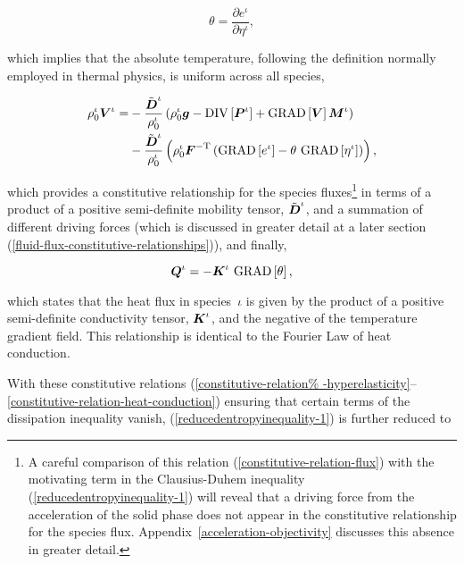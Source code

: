 \begin{equation}
\theta = \frac{\partial e^\iota}{\partial \eta^\iota},
\label{constitutive-relation-temperature}
\end{equation}

\noindent which implies that the absolute temperature, following the
definition normally employed in thermal physics, is uniform across all
species,

\begin{equation}
\begin{split}
\rho^\iota_0\mbox{\boldmath$ V$}^\iota  = & -\frac{\tilde{\mbox{\boldmath$ D$}}^\iota}{\rho^\iota_0} \left(
 \rho_0^\iota\mbox{\boldmath$ g$} - \mathrm{DIV}\left[\mbox{\boldmath$ P$}^\iota\right] +
\mathrm{GRAD}\left[\mbox{\boldmath$ V$}\right]\mbox{\boldmath$ M$}^\iota\right)\\
& -\frac{\tilde{\mbox{\boldmath$ D$}}^\iota}{\rho^\iota_0}\left(\rho^\iota_0
\mbox{\boldmath$ F$}^{-\mathrm{T}}\left( \mathrm{GRAD}\left[ e^\iota\right]
  - \theta\ \mathrm{GRAD}\left[\eta^\iota\right]\right)\right),
\label{constitutive-relation-flux}
\end{split}
\end{equation}

\noindent which provides a constitutive relationship for the species
fluxes\footnote{A careful comparison of this relation
  (\ref{constitutive-relation-flux}) with the motivating term in the
  Clausius-Duhem inequality (\ref{reducedentropyinequality-1}) will
  reveal that a driving force from the acceleration of the solid phase
  does not appear in the constitutive relationship for the species
  flux. Appendix~\ref{acceleration-objectivity} discusses this absence
  in greater detail.} in terms of a product of a positive
semi-definite mobility tensor, ${\tilde{\mbox{\boldmath$ D$}}}^\iota$, and a summation
of different driving forces (which is discussed in greater detail at a
later section (\ref{fluid-flux-constitutive-relationships})), and
finally,

\begin{equation}
\bQ^\iota = -{\bK}^\iota\ \mathrm{GRAD}\left[\theta\right],
\label{constitutive-relation-heat-conduction}
\end{equation}

\noindent which states that the heat flux in species~$\iota$ is given
by the product of a positive semi-definite conductivity tensor,
${\mbox{\boldmath$ K$}}^\iota$, and the negative of the temperature gradient
field. This relationship is identical to the Fourier Law of heat
conduction.

With these constitutive relations (\ref{constitutive-relation%
-hyperelasticity}--\ref{constitutive-relation-heat-conduction})
ensuring that certain terms of the dissipation inequality vanish,
(\ref{reducedentropyinequality-1}) is further reduced to

